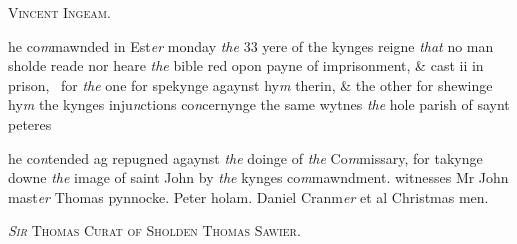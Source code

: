 \documentclass[12pt, a4paper]{book}
\begin{document}
            
               
				\begin{center} \begin{large} {\scshape Vincent Ingeam.} \end{large} \end{center}
			

            	
            		
				\marginpar[\vspace{0.5cm}{\textcolor{Gray}{Injunctions}}]{}
			
            		
				\marginpar[\vspace{0.5cm}{\textcolor{Gray}{ex n}}]{}
			
            		
		\ifthenelse{\isodd{\thepage}}
		{\reversemarginpar}
		{\normalmarginpar}
		he co\textit{m}mawnded in Est\textit{er} monday \textit{the} 33 yere of the kynges
 reigne \textit{that} no man sholde reade nor heare \textit{the} bible
  red opon payne of imprisonment, \& cast ii in prison, 
 for \textit{the} one for spekynge agaynst hy\textit{m} therin, \& the other
 for shewinge hy\textit{m} the kynges inju\textit{n}ctions co\textit{n}cernynge the same
 wytnes \textit{the} hole parish of saynt peteres
            	
				\marginpar[\vspace{0.5cm}{\textcolor{Gray}{Images}}]{}
			
		\ifthenelse{\isodd{\thepage}}
		{\reversemarginpar}
		{\normalmarginpar}
		he co\textit{n}tended ag repugned agaynst \textit{the} doinge of \textit{the}
 Co\textit{m}missary, for takynge downe \textit{the} image of saint John
 by \textit{the} kynges co\textit{m}mawndment. witnesses Mr John mast\textit{er}
 Thomas pynnocke. Peter holam. Daniel Cranm\textit{er} et al
 Christmas men.
 
            	
 

            
            	
				\begin{center} \begin{large} {\scshape \textit{Sir} Thomas Curat of Sholden Thomas Sawier.} \end{large} \end{center}
			

            	
            		
				\marginpar[\vspace{0.5cm}{\textcolor{Gray}{Images}}]{}
			
            		
				\marginpar[\vspace{0.5cm}{\textcolor{Gray}{n}}]{}
			
\end{document}
